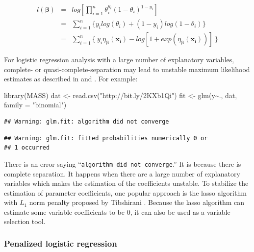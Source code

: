 \documentclass[
  12pt,
]{krantz}
\makeatletter
\newenvironment{Shaded}{\begin{snugshade}}{\end{snugshade}}
\newcommand{\AttributeTok}[1]{\textcolor[rgb]{0.61,0.61,0.61}{#1}}
\newcommand{\FunctionTok}[1]{\textcolor[rgb]{0,0,0}{#1}}
\newcommand{\NormalTok}[1]{#1}
\newcommand{\OtherTok}[1]{\textcolor[rgb]{0.37,0.37,0.37}{#1}}
\newcommand{\SpecialCharTok}[1]{\textcolor[rgb]{0,0,0}{#1}}
\newcommand{\StringTok}[1]{\textcolor[rgb]{0.5,0.5,0.5}{#1}}
\newenvironment{kframe}{%
\medskip{}
\setlength{\fboxsep}{.8em}
 \def\at@end@of@kframe{}%
 \ifinner\ifhmode%
  \def\at@end@of@kframe{\end{minipage}}%
  \begin{minipage}{\columnwidth}%
 \fi\fi%
 \def\FrameCommand##1{\hskip\@totalleftmargin \hskip-\fboxsep
 \colorbox{shadecolor}{##1}\hskip-\fboxsep
     \hskip-\linewidth \hskip-\@totalleftmargin \hskip\columnwidth}%
 \MakeFramed {\advance\hsize-\width
   \@totalleftmargin\z@ \linewidth\hsize
   \@setminipage}}%
 {\par\unskip\endMakeFramed%
 \at@end@of@kframe}
\renewenvironment{Shaded}{\begin{kframe}}{\end{kframe}}
\makeatother
\begin{document}
\begin{eqnarray*}
l(\mathbf{\beta})&=&log[\prod_{i=1}^{n}\theta_{i}^{y_{i}}(1-\theta_{i})^{1-y_{i}}]\\
&=&\sum_{i=1}^{n}\{y_{i}log(\theta_{i})+(1-y_{i})log(1-\theta_{i})\}\\
&=&\sum_{i=1}^{n}\{\ y_{i}\eta_{\mathbf{\beta}}(\mathbf{x_{i}})-log[1+exp(\eta_{\mathbf{\beta}}(\mathbf{x_{i}}))]\ \}
\label{eq:logisticlikelihood}
\end{eqnarray*}

For logistic regression analysis with a large number of explanatory variables, complete- or quasi-complete-separation may lead to unstable maximum likelihood estimates as described in \citep{Wed1976} and \citep{albert1984}. For example:

\begin{Shaded}
\begin{Highlighting}[]
\FunctionTok{library}\NormalTok{(MASS)}
\NormalTok{dat }\OtherTok{\textless{}{-}} \FunctionTok{read.csv}\NormalTok{(}\StringTok{"http://bit.ly/2KXb1Qi"}\NormalTok{)}
\NormalTok{fit }\OtherTok{\textless{}{-}} \FunctionTok{glm}\NormalTok{(y}\SpecialCharTok{\textasciitilde{}}\NormalTok{., dat, }\AttributeTok{family =} \StringTok{"binomial"}\NormalTok{)}
\end{Highlighting}
\end{Shaded}

\begin{verbatim}
## Warning: glm.fit: algorithm did not converge
\end{verbatim}

\begin{verbatim}
## Warning: glm.fit: fitted probabilities numerically 0 or
## 1 occurred
\end{verbatim}

There is an error saying ``\texttt{algorithm\ did\ not\ converge}.'' It is because there is complete separation. It happens when there are a large number of explanatory variables which makes the estimation of the coefficients unstable. To stabilize the estimation of parameter coefficients, one popular approach is the lasso algorithm with \(L_1\) norm penalty proposed by Tibshirani \citep{Tibshirani1996}. Because the lasso algorithm can estimate some variable coefficients to be 0, it can also be used as a variable selection tool.

\hypertarget{penalized-logistic-regression-1}{%
\subsubsection{Penalized logistic regression}\label{penalized-logistic-regression-1}}
\end{document}
